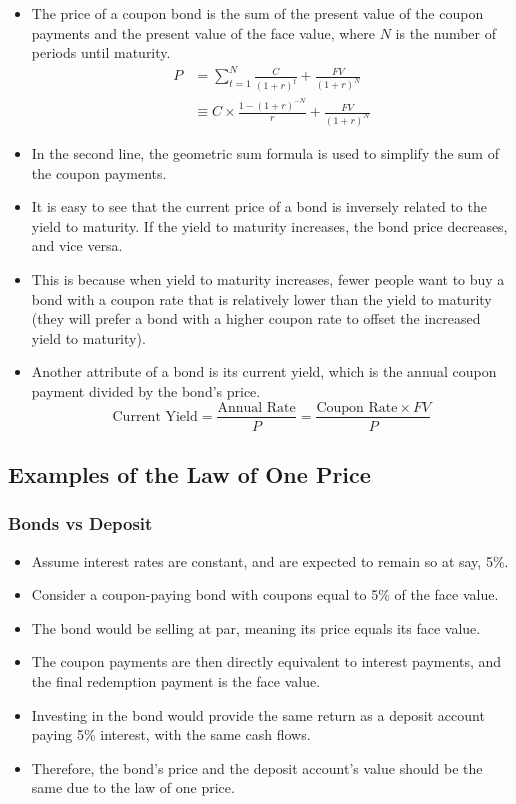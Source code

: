 \begin{itemize}
\begin{equation}
    \end{equation}
    \item The price of a coupon bond is the sum of the present value of the coupon payments and the present value of the face value, where $N$ is the number of periods until maturity. 
        \begin{align}
            P &= \sum_{t=1}^{N} \frac{C}{(1 + r)^t} + \frac{FV}{(1 + r)^N}\\
              &\equiv C \times \frac{ 1-(1+ r)^{-N}}{r} + \frac{FV}{(1 + r)^N}
          \end{align}
    \item In the second line, the geometric sum formula is used to simplify the sum of the coupon payments.
    \item It is easy to see that the current price of a bond is inversely related to the yield to maturity. If the yield to maturity increases, the bond price decreases, and vice versa.
    \item This is because when yield to maturity increases, fewer people want to buy a bond with a coupon rate that is relatively lower than the yield to maturity (they will prefer a bond with a higher coupon rate to offset the increased yield to maturity).
    \item Another attribute of a bond is its current yield, which is the annual coupon payment divided by the bond's price.
    \begin{equation}
        \text{Current Yield} = \frac{\text{Annual Rate}}{P} = \frac{\text{Coupon Rate} \times FV}{P}
    \end{equation}
        
\end{itemize}

\subsection*{Examples of the Law of One Price}
\subsubsection*{Bonds vs Deposit}
\begin{itemize}
    \item Assume interest rates are constant, and are expected to remain so at say, 5\%.
    \item Consider a coupon-paying bond with coupons equal to 5\% of the face value.
    \item The bond would be selling at par, meaning its price equals its face value.
    \item The coupon payments are then directly equivalent to interest payments, and the final redemption payment is the face value.
    \item Investing in the bond would provide the same return as a deposit account paying 5\% interest, with the same cash flows.
    \item Therefore, the bond's price and the deposit account's value should be the same due to the law of one price.
\end{itemize}

